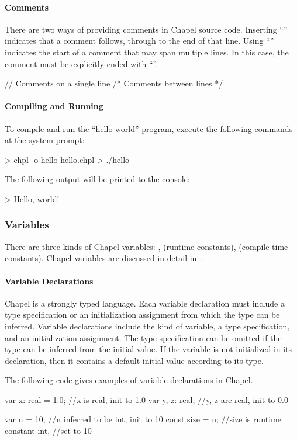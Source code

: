\paragraph{Comments} 
There are two ways of providing comments in Chapel source code.
Inserting ``\chpl{//}'' indicates that a comment follows, through to  
the end of that line.  Using ``\chpl{/*}'' indicates the start of a comment that
may span multiple lines.  In this case, the comment must be
explicitly ended with ``\chpl{*/}''.
\begin{chapel}
// Comments on a single line
/* Comments
   between lines */
\end{chapel}

\paragraph{Compiling and Running} 
To compile and run the ``hello world'' program, execute the 
following commands at the system prompt:
\begin{commandline} 
> chpl -o hello hello.chpl
> ./hello
\end{commandline}
The following output will be printed to the console:
\begin{commandline}
> Hello, world!
\end{commandline}

\subsubsection{Variables}
There are three kinds of Chapel variables: ,
 (runtime constants),  (compile time constants).
Chapel variables are discussed in detail in~.

\paragraph{Variable Declarations}
Chapel is a strongly typed language.  Each variable declaration
must include a type specification or an initialization assignment 
from which the type can be inferred.  
Variable declarations include the kind of variable, a type specification,
and an initialization assignment.  The type specification can be
omitted if the type can be inferred from the initial value.  If the
variable is not initialized in its declaration, then it contains a
default initial value according to its type.

\begin{example}
The following code gives examples of variable declarations in Chapel.
\begin{chapel}
var x: real = 1.0; //x is real, init to 1.0
var y, z: real; //y, z are real, init to 0.0

var n = 10; //n inferred to be int, init to 10
const size = n; //size is runtime constant int,
                //set to 10
\end{chapel}
\end{example}

